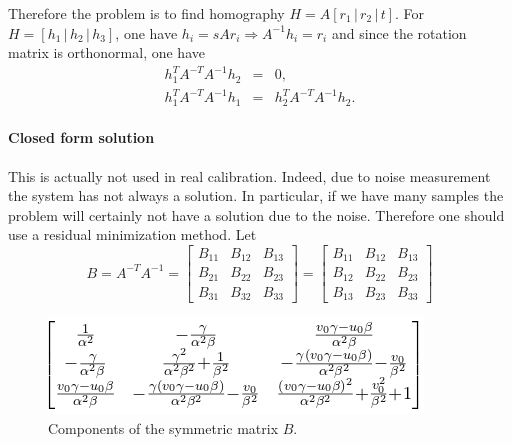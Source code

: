 \documentclass[11pt,a4paper]{article}
\begin{document}
Therefore the problem is to find homography $H = A [r_1 \,|\,r_2\,|\, t]$. For $ H = [h_1 \,|\,h_2 \,|\,h_3 ]$, one have $h_i = s A r_i \Rightarrow A^{-1} h_i = r_i$ and since the rotation matrix is orthonormal, one have
\begin{equation}
\begin{array}{rcl}
h_1^T A^{-T} A^{-1} h_2 &=& 0, \\
h_1^T A^{-T} A^{-1} h_1 &=& h_2^T A^{-T} A^{-1} h_2. 
\end{array}
\label{CalibrationFundamentalContraints}
\end{equation}

\paragraph{Closed form solution} This is actually not used in real calibration. Indeed, due to noise measurement the system has not always a solution. In particular, if we have many samples the problem will certainly not have a solution due to the noise. Therefore one should use a residual minimization method. Let
\begin{equation}
B = A^{-T}A^{-1} =
\left[ 
\begin{array}{ccc}
B_{11} & B_{12} & B_{13} \\
B_{21} & B_{22} & B_{23} \\
B_{31} & B_{32} & B_{33} 
\end{array}
\right]
=
\left[ 
\begin{array}{ccc}
B_{11} & B_{12} & B_{13} \\
B_{12} & B_{22} & B_{23} \\
B_{13} & B_{23} & B_{33} 
\end{array}
\right]
\end{equation}
\begin{figure}[!h]
\centering
\includegraphics[scale=0.7]{Pictures/CalibrationMatrixB.png}
\caption{Components of the symmetric matrix $B$. \label{CalibrationMatrixB}}
\end{figure}
\end{document}

